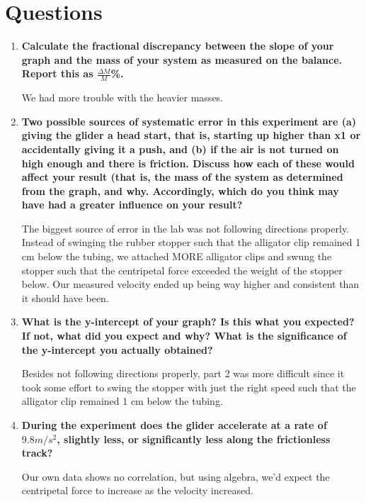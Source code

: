 
 \section{Questions}

\vspace{-0.5cm}
\singlespacing

\begin{enumerate}
	\item \textbf{Calculate the fractional discrepancy between the slope of your graph and the mass of your system as measured on the balance. Report this as $\frac{\Delta{M}}{M}$\%.}

		We had more trouble with the heavier masses.

	\item \textbf{Two possible sources of systematic error in this experiment are (a) giving the glider a head start, that is, starting up higher than x1 or accidentally giving it a push, and (b) if the air is not turned on high enough and there is friction. Discuss how each of these would affect your result (that is, the mass of the system as determined from the graph, and why. Accordingly, which do you think may have had a greater influence on your result?}

	The biggest source of error in the lab was not following directions properly. Instead of swinging the rubber stopper such that the alligator clip remained 1 cm below the tubing, we attached MORE alligator clips and swung the stopper such that the centripetal force exceeded the weight of the stopper below. Our measured velocity ended up being way higher and consistent than it should have been. 

\item \textbf{What is the y-intercept of your graph? Is this what you expected? If not, what did you expect and why? What is the significance of the y-intercept you actually obtained?}

Besides not following directions properly, part 2 was more difficult since it took some effort to swing the stopper with just the right speed such that the alligator clip remained 1 cm below the tubing.

\item \textbf{During the experiment does the glider accelerate at a rate of $9.8 m/s^2$, slightly less, or significantly less along the frictionless track?}

Our own data shows no correlation, but using algebra, we'd expect the centripetal force to increase as the velocity increased. 
\end{enumerate}

\newpage
